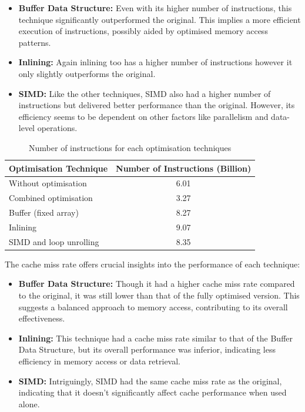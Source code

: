 \documentclass{article}
\theoremstyle{break}
\begin{document}
\begin{itemize}
    \item \textbf{Buffer Data Structure:} Even with its higher number of instructions, this technique significantly outperformed the original. This implies a more efficient execution of instructions, possibly aided by optimised memory access patterns.
    \item \textbf{Inlining:} Again inlining too has a higher number of instructions however it only slightly outperforms the original.
    \item \textbf{SIMD:} Like the other techniques, SIMD also had a higher number of instructions but delivered better performance than the original. However, its efficiency seems to be dependent on other factors like parallelism and data-level operations.
\end{itemize}

\begin{table}[htbp]
\centering
\begin{tabular}{lc}
\toprule
\textbf{Optimisation Technique} & \textbf{Number of Instructions (Billion)} \\
\midrule
Without optimisation & 6.01 \\
Combined optimisation & 3.27 \\
Buffer (fixed array) & 8.27 \\
Inlining & 9.07 \\
SIMD and loop unrolling & 8.35 \\
\bottomrule
\end{tabular}
\caption{Number of instructions for each optimisation techniques}
\label{tab:num_instructions}
\end{table}


The cache miss rate offers crucial insights into the performance of each technique:

\begin{itemize}
    \item \textbf{Buffer Data Structure:} Though it had a higher cache miss rate compared to the original, it was still lower than that of the fully optimised version. This suggests a balanced approach to memory access, contributing to its overall effectiveness.
    \item \textbf{Inlining:} This technique had a cache miss rate similar to that of the Buffer Data Structure, but its overall performance was inferior, indicating less efficiency in memory access or data retrieval.
    \item \textbf{SIMD:} Intriguingly, SIMD had the same cache miss rate as the original, indicating that it doesn't significantly affect cache performance when used alone. 
\end{itemize}
\end{document}
